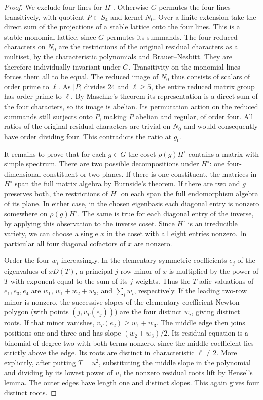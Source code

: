 \documentclass[a4paper,11pt]{article}
\theoremstyle{definition}
\theoremstyle{remark}
\numberwithin{equation}{section}
\begin{document}
\begin{proof}
We exclude four lines for \(H^\circ\). Otherwise \(G\)
permutes the four lines transitively, with quotient
\(P\subset S_4\) and kernel \(N_0\). Over a finite
extension take the direct sum of the projections of
a stable lattice onto the four lines. This is a stable
monomial lattice, since \(G\) permutes its summands.
The four reduced characters on \(N_0\) are the restrictions
of the original residual characters as a multiset, by
the characteristic polynomials and Brauer--Nesbitt.
They are therefore individually invariant under \(G\).
Transitivity on the monomial lines forces them all to be
equal. The reduced image of \(N_0\) thus consists of
scalars of order prime to \(\ell\). As \(|P|\) divides
24 and \(\ell\ge5\), the entire reduced matrix group has
order prime to \(\ell\). By Maschke's theorem its
representation is a direct sum of the four characters,
so its image is abelian. Its permutation action on the
reduced summands still surjects onto \(P\), making \(P\)
abelian and regular, of order four. All ratios of the
original residual characters are trivial on \(N_0\) and
would consequently have order dividing four. This
contradicts the ratio at \(g_0\).

It remains to prove that for each \(g\in G\) the coset
\(\rho(g)H^\circ\) contains a matrix with simple spectrum.
There are two possible decompositions under \(H^\circ\):
one four-dimensional constituent or two planes.
If there is one constituent, the matrices in \(H^\circ\)
span the full matrix algebra by Burnside's theorem. If
there are two and \(g\) preserves both, the restrictions
of \(H^\circ\) on each span the full endomorphism algebra
of its plane. In either case, in the chosen eigenbasis
each diagonal entry is nonzero somewhere on
\(\rho(g)H^\circ\). The same is true for each diagonal
entry of the inverse, by applying this observation to the
inverse coset. Since \(H^\circ\) is an irreducible variety,
we can choose a single \(x\) in the coset with all eight
entries nonzero. In particular all four diagonal cofactors
of \(x\) are nonzero.

Order the four \(w_i\) increasingly. In the elementary
symmetric coefficients \(e_j\) of the eigenvalues of
\(xD(T)\), a principal \(j\)-row minor of \(x\) is
multiplied by the power of \(T\) with exponent equal to
the sum of its \(j\) weights. Thus the \(T\)-adic
valuations of \(e_1,e_3,e_4\) are \(w_1\),
\(w_1+w_2+w_3\), and \(\sum_iw_i\), respectively.
If the leading two-row minor is nonzero, the successive
slopes of the elementary-coefficient Newton polygon
(with points \((j,v_T(e_j))\)) are the four distinct
\(w_i\), giving distinct roots. If that minor vanishes,
\(v_T(e_2)\ge w_1+w_3\). The middle edge then joins
positions one and three and has slope \((w_2+w_3)/2\).
Its residual equation is a binomial of degree two with
both terms nonzero, since the middle coefficient lies
strictly above the edge. Its roots are distinct in
characteristic \(\ell\ne2\). More explicitly, after
putting \(T=u^2\), substituting the middle slope in the
polynomial and dividing by its lowest power of \(u\),
the nonzero residual roots lift by Hensel's lemma.
The outer edges have length one and distinct slopes.
This again gives four distinct roots.


\end{proof}
\end{document}
